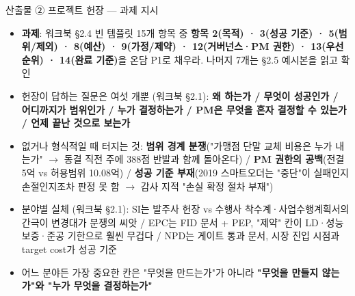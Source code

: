 \begin{frame}[allowframebreaks=1.0]{산출물 ② 프로젝트 헌장 — 과제 지시}
\small
\begin{itemize}
\item\relax \textbf{과제}: 워크북 §2.4 빈 템플릿 15개 항목 중 \textbf{항목 2(목적) · 3(성공 기준) · 5(범위/제외) · 8(예산) · 9(가정/제약) · 12(거버넌스·PM 권한) · 13(우선순위) · 14(완료 기준)}을 온담 P1로 채우라. 나머지 7개는 §2.5 예시본을 읽고 확인
\item\relax 헌장이 답하는 질문은 여섯 개뿐 (워크북 §2.1): \textbf{왜 하는가 / 무엇이 성공인가 / 어디까지가 범위인가 / 누가 결정하는가 / PM은 무엇을 혼자 결정할 수 있는가 / 언제 끝난 것으로 보는가}
\item\relax 없거나 형식적일 때 터지는 것: \textbf{범위 경계 분쟁}("가맹점 단말 교체 비용은 누가 내는가" $\rightarrow$ 동결 직전 주에 388점 반발과 함께 돌아온다) / \textbf{PM 권한의 공백}(전결 5억 vs 허용범위 10.08억) / \textbf{성공 기준 부재}(2019 스마트오더는 "중단"이 실패인지 손절인지조차 판정 못 함 $\rightarrow$ 감사 지적 "손실 확정 절차 부재")
\item\relax 분야별 실체 (워크북 §2.1): SI는 발주사 헌장 vs 수행사 착수계·사업수행계획서의 간극이 변경대가 분쟁의 씨앗 / EPC는 FID 문서 + PEP, "제약" 칸이 LD·성능 보증·준공 기한으로 훨씬 무겁다 / NPD는 게이트 통과 문서, 시장 진입 시점과 target cost가 성공 기준
\item\relax 어느 분야든 가장 중요한 칸은 "무엇을 만드는가"가 아니라 \textbf{"무엇을 만들지 않는가"와 "누가 무엇을 결정하는가"}
\end{itemize}
\end{frame}

